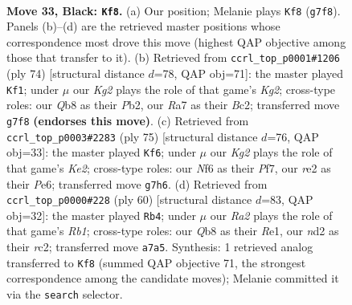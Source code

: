 \documentclass[11pt]{article}
\begin{document}
\clearpage

\begin{figure}[p]\centering
\begin{subfigure}{0.46\textwidth}\centering
\resizebox{\linewidth}{!}{%
\newchessgame
\chessboard[
  setfen={1qb5/r4pk1/2B2np1/6Np/P7/1p4P1/3NRP1P/R6K b - - 1 33},
  showmover=false,
  pgfstyle=straightmove, color=movearrow, markmove={g7-f8}
]}
\caption{}
\end{subfigure}\hfill
\begin{subfigure}{0.46\textwidth}\centering
\resizebox{\linewidth}{!}{%
\newchessgame
\chessboard[
  setfen={8/1p4k1/p1p2r2/P3r1n1/1Q2p1b1/2P5/1PBR1PK1/8 w - - 6 38},
  showmover=false,
  pgfstyle=straightmove, color=movearrow, markmove={g2-f1}
]}
\caption{}
\end{subfigure}
\\[4pt]
\begin{subfigure}{0.46\textwidth}\centering
\resizebox{\linewidth}{!}{%
\newchessgame
\chessboard[
  setfen={8/2p1kp2/4p2B/q2r1p2/P1RP3P/6P1/5P2/R5K1 b - - 0 38},
  showmover=false,
  pgfstyle=straightmove, color=movearrow, markmove={e7-f6}
]}
\caption{}
\end{subfigure}\hfill
\begin{subfigure}{0.46\textwidth}\centering
\resizebox{\linewidth}{!}{%
\newchessgame
\chessboard[
  setfen={5k2/1nr3p1/1p2p2p/8/P2bN3/6P1/2r1BPKP/1R2R3 w - - 2 31},
  showmover=false,
  pgfstyle=straightmove, color=movearrow, markmove={b1-b4}
]}
\caption{}
\end{subfigure}
\caption{\textbf{Move 33, Black: \texttt{Kf8}.} (a) Our position; Melanie plays \texttt{Kf8} (\texttt{g7f8}). Panels (b)--(d) are the retrieved master positions whose correspondence most drove this move (highest QAP objective among those that transfer to it). (b) Retrieved from \texttt{ccrl\_top\_p0001\#1206} (ply 74) [structural distance $d$=78, QAP obj=71]: the master played \texttt{Kf1}; under $\mu$ our \emph{Kg2} plays the role of that game's \emph{Kg2}; cross-type roles: our \emph{Q}b8 as their \emph{P}b2, our \emph{R}a7 as their \emph{B}c2; transferred move \texttt{g7f8} \textbf{(endorses this move)}. (c) Retrieved from \texttt{ccrl\_top\_p0003\#2283} (ply 75) [structural distance $d$=76, QAP obj=33]: the master played \texttt{Kf6}; under $\mu$ our \emph{Kg2} plays the role of that game's \emph{Ke2}; cross-type roles: our \emph{N}f6 as their \emph{P}f7, our \emph{r}e2 as their \emph{P}e6; transferred move \texttt{g7h6}. (d) Retrieved from \texttt{ccrl\_top\_p0000\#228} (ply 60) [structural distance $d$=83, QAP obj=32]: the master played \texttt{Rb4}; under $\mu$ our \emph{Ra2} plays the role of that game's \emph{Rb1}; cross-type roles: our \emph{Q}b8 as their \emph{R}e1, our \emph{n}d2 as their \emph{r}c2; transferred move \texttt{a7a5}. Synthesis: 1 retrieved analog transferred to \texttt{Kf8} (summed QAP objective 71, the strongest correspondence among the candidate moves); Melanie committed it via the \texttt{search} selector.}
\label{fig:thought-m65}
\end{figure}
\end{document}
